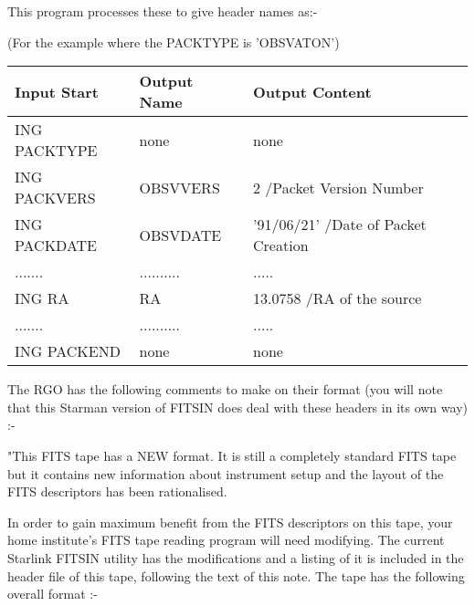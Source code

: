 {{  This program processes these to give header names as:-
                                                                               
  (For the example where the PACKTYPE is 'OBSVATON')
                                                                               
\hspace*{6ex}\begin{tabular}{|l|p{1in}|p{2in}|}\hline  
      Input Start   &     Output Name &  Output Content\\ \hline
      ING PACKTYPE  &     none        &   none \\
      ING PACKVERS  &     OBSVVERS    &         2     /Packet Version Number \\
      ING PACKDATE  &     OBSVDATE    &   '91/06/21'  /Date of Packet Creation \\
            ....... & ..........      &  ..... \\
      ING RA        &     RA          &     13.0758   /RA of the source \\
            ....... & ..........      & ..... \\
      ING PACKEND   &     none        &    none \\ \hline
\end{tabular}
                                                                               
                                                                               
  The RGO has the following comments to make on their format (you
  will note that this Starman version of FITSIN does deal with
  these headers in its own way) :-
                                                                               
                                                                               
  "This FITS tape has a NEW  format. It is still a completely
   standard FITS tape but it contains new information about instrument
   setup and the layout of the FITS descriptors has been rationalised.
                                                                               
  In order to gain maximum benefit from the FITS descriptors on
  this tape, your home institute's FITS tape reading program will need
  modifying. The current Starlink FITSIN utility has the modifications
  and a listing of it is included in the header file of this tape,
  following the text of this note. The tape has the following overall
  format :-
                                                                               
}}
